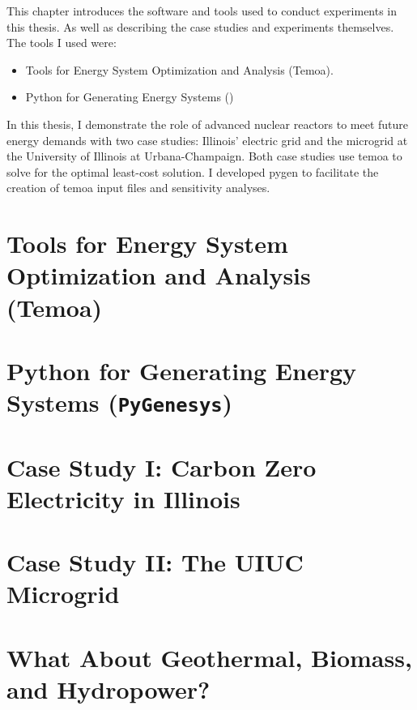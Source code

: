This chapter introduces the software and tools used to conduct experiments in this
thesis. As well as describing the case studies and experiments themselves.
The tools I used were:
\begin{itemize}
  \item Tools for Energy System Optimization and Analysis (Temoa).
  \item Python for Generating Energy Systems (\pygen)
\end{itemize}
In this thesis, I demonstrate the role of advanced nuclear reactors to meet future
energy demands with two case studies: Illinois’ electric grid and the microgrid
at the University of Illinois at Urbana-Champaign. Both case studies use \gls{temoa}
to solve for the optimal least-cost solution. I developed \gls{pygen} to
facilitate the creation of \gls{temoa} input files and sensitivity analyses.

\section{Tools for Energy System Optimization and Analysis (Temoa)}


\section{Python for Generating Energy Systems (\texttt{PyGenesys})}



\section{Case Study I: Carbon Zero Electricity in Illinois}
\label{section:ilmodel}


\section{Case Study II: The UIUC Microgrid}
\label{section:uiucmodel}


\section{What About Geothermal, Biomass, and Hydropower?}
\label{section:alt_firm}

